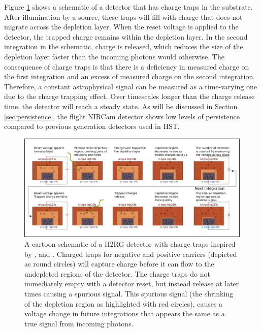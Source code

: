 \documentclass{aastex62}
\begin{document}
Figure \ref{fig:npSchematicTraps} shows a schematic of a detector that has charge traps in the substrate.
After illumination by a source, these traps will fill with charge that does not migrate across the depletion layer.
When the reset voltage is applied to the detector, the trapped charge remains within the depletion layer.
In the second integration in the schematic, charge is released, which reduces the size of the depletion layer faster than the incoming photons would otherwise.
The consequence of charge traps is that there is a deficiency in measured charge on the first integration and an excess of measured charge on the second integration.
Therefore, a constant astrophysical signal can be measured as a time-varying one due to the charge trapping effect.
Over timescales longer than the charge release time, the detector will reach a steady state.
As will be discussed in Section \ref{sec:persistence}, the flight NIRCam detector shows low levels of persistence compared to previous generation detectors used in HST.

\begin{figure}[!hbtp]
\centering
\includegraphics[width=.99\columnwidth]{charge_traps_photodiode.pdf}
\caption{A cartoon schematic of a H2RG detector with charge traps inspired by \citet{smith2008imgPersistence}, \citet{tulloch2018persistenceH2RG} and \citet{leisenring2016persistence}.
Charged traps for negative and positive carriers (depicted as round circles) will capture charge before it can flow to the undepleted regions of the detector.
The charge traps do not immediately empty with a detector reset, but instead release at later times causing a spurious signal.
This spurious signal (the shrinking of the depletion region as highlighted with red circles), causes a voltage change in future integrations that appears the same as a true signal from incoming photons.}\label{fig:npSchematicTraps}
\end{figure}
\end{document}
